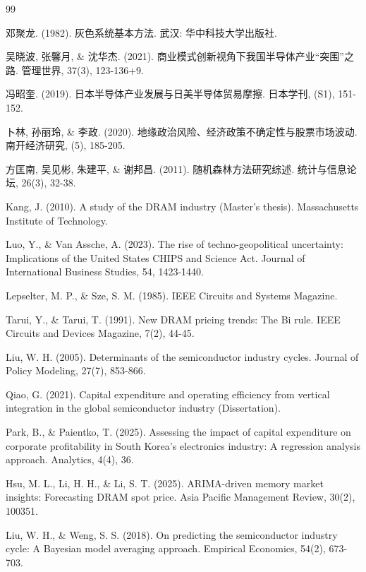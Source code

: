 \documentclass[a4paper,12pt,fontset=fandol]{ctexart}
\begin{document}
\renewcommand{\refname}{}
\begingroup
{}\songti
\begin{thebibliography}{99}

邓聚龙. (1982). 灰色系统基本方法. 武汉: 华中科技大学出版社.

吴晓波, 张馨月, \& 沈华杰. (2021). 商业模式创新视角下我国半导体产业“突围”之路. 管理世界, 37(3), 123-136+9.

冯昭奎. (2019). 日本半导体产业发展与日美半导体贸易摩擦. 日本学刊, (S1), 151-152.

卜林, 孙丽玲, \& 李政. (2020). 地缘政治风险、经济政策不确定性与股票市场波动. 南开经济研究, (5), 185-205.

方匡南, 吴见彬, 朱建平, \& 谢邦昌. (2011). 随机森林方法研究综述. 统计与信息论坛, 26(3), 32-38.

Kang, J. (2010). A study of the DRAM industry (Master's thesis). Massachusetts Institute of Technology.

Luo, Y., \& Van Assche, A. (2023). The rise of techno-geopolitical uncertainty: Implications of the United States CHIPS and Science Act. Journal of International Business Studies, 54, 1423-1440.

Lepselter, M. P., \& Sze, S. M. (1985). IEEE Circuits and Systems Magazine.

Tarui, Y., \& Tarui, T. (1991). New DRAM pricing trends: The Bi rule. IEEE Circuits and Devices Magazine, 7(2), 44-45.

Liu, W. H. (2005). Determinants of the semiconductor industry cycles. Journal of Policy Modeling, 27(7), 853-866.

Qiao, G. (2021). Capital expenditure and operating efficiency from vertical integration in the global semiconductor industry (Dissertation).


Park, B., \& Paientko, T. (2025). Assessing the impact of capital expenditure on corporate profitability in South Korea's electronics industry: A regression analysis approach. Analytics, 4(4), 36.

Hsu, M. L., Li, H. H., \& Li, S. T. (2025). ARIMA-driven memory market insights: Forecasting DRAM spot price. Asia Pacific Management Review, 30(2), 100351.

Liu, W. H., \& Weng, S. S. (2018). On predicting the semiconductor industry cycle: A Bayesian model averaging approach. Empirical Economics, 54(2), 673-703.


\end{thebibliography}
\end{document}
